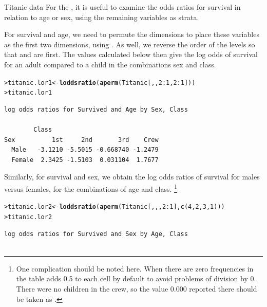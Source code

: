 \documentclass[10pt,krantz2]{krantz}\usepackage[]{graphicx}\usepackage[]{color}
\makeatletter
\newcommand{\hlnum}[1]{\textcolor[rgb]{0.686,0.059,0.569}{#1}}%
\newcommand{\hlopt}[1]{\textcolor[rgb]{0,0,0}{#1}}%
\newcommand{\hlstd}[1]{\textcolor[rgb]{0.345,0.345,0.345}{#1}}%
\newcommand{\hlkwb}[1]{\textcolor[rgb]{0.69,0.353,0.396}{#1}}%
\newcommand{\hlkwd}[1]{\textcolor[rgb]{0.737,0.353,0.396}{\textbf{#1}}}%
\newenvironment{kframe}{%
 \def\at@end@of@kframe{}%
 \ifinner\ifhmode%
  \def\at@end@of@kframe{\end{minipage}}%
  \begin{minipage}{\columnwidth}%
 \fi\fi%
 \def\FrameCommand##1{\hskip\@totalleftmargin \hskip-\fboxsep
 \colorbox{shadecolor}{##1}\hskip-\fboxsep
     \hskip-\linewidth \hskip-\@totalleftmargin \hskip\columnwidth}%
 \MakeFramed {\advance\hsize-\width
   \@totalleftmargin\z@ \linewidth\hsize
   \@setminipage}}%
 {\par\unskip\endMakeFramed%
 \at@end@of@kframe}
\newenvironment{knitrout}{}{} %
\renewenvironment{knitrout}{\small\renewcommand{\baselinestretch}{.85}}{} %
\makeatother
\begin{document}
\begin{Example}{Titanic data}
For the , it is useful to examine the odds ratios for survival in relation to age or sex, using the
remaining variables as strata. 

For survival and age, we need to permute the dimensions to place these variables as the first two dimensions,
using .  As well, we reverse the order of the levels so that  and
 are first.  The values calculated below then give the log odds of survival for an
adult compared to a child in the combinations sex and class.
\begin{knitrout}
\color{fgcolor}\begin{kframe}
\begin{alltt}
\hlstd{> }\hlstd{titanic.lor1} \hlkwb{<-} \hlkwd{loddsratio}\hlstd{(}\hlkwd{aperm}\hlstd{(Titanic[,,}\hlnum{2}\hlopt{:}\hlnum{1}\hlstd{,}\hlnum{2}\hlopt{:}\hlnum{1}\hlstd{]))}
\hlstd{> }\hlstd{titanic.lor1}
\end{alltt}
\begin{verbatim}
log odds ratios for Survived and Age by Sex, Class 

        Class
Sex          1st     2nd       3rd    Crew
  Male   -3.1210 -5.5015 -0.668740 -1.2479
  Female  2.3425 -1.5103  0.031104  1.7677
\end{verbatim}
\end{kframe}
\end{knitrout}
Similarly, for survival and sex, we obtain the log odds ratios of survival for males versus females,
for the combinations of age and class.%
\footnote{
One complication should be noted here.  When there are zero frequencies in the table
 adds 0.5 to each cell by default to avoid problems of division by 0.
There were no children in the crew, so the value 0.000 reported there should be
taken as .
}
\begin{knitrout}
\color{fgcolor}\begin{kframe}
\begin{alltt}
\hlstd{> }\hlstd{titanic.lor2} \hlkwb{<-} \hlkwd{loddsratio}\hlstd{(}\hlkwd{aperm}\hlstd{(Titanic[,,,}\hlnum{2}\hlopt{:}\hlnum{1}\hlstd{],} \hlkwd{c}\hlstd{(}\hlnum{4}\hlstd{,}\hlnum{2}\hlstd{,}\hlnum{3}\hlstd{,}\hlnum{1}\hlstd{)))}
\hlstd{> }\hlstd{titanic.lor2}
\end{alltt}
\begin{verbatim}
log odds ratios for Survived and Sex by Age, Class 


\end{verbatim}
\end{kframe}
\end{knitrout}
\end{Example}
\end{document}
